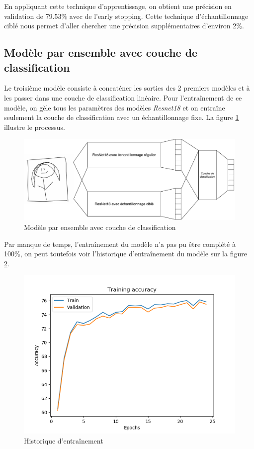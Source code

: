 En appliquant cette technique d'apprentissage, on obtient une précision en validation de 79.53\% avec de l'early stopping. 
Cette technique d'échantillonnage ciblé nous permet d'aller chercher une précision supplémentaires d'environ 2\%.


\subsection{Modèle par ensemble avec couche de classification}
Le troisième modèle consiste à concaténer les sorties des 2 premiers modèles et à les passer dans une couche de classification linéaire. Pour l'entraînement de ce modèle, on gèle tous les paramètres des modèles \emph{Resnet18} et on entraîne seulement la couche de classification avec un échantillonnage fixe. La figure \ref{strutureensemble} illustre le processus.

\begin{figure}[h]
	\includegraphics[width=\linewidth]{images/structure_reseau.pdf} %
	\caption{Modèle par ensemble avec couche de classification} %
	\label{strutureensemble} 
\end{figure}


Par manque de temps, l'entraînement du modèle n'a pas pu être complété à 100\%, on peut toutefois voir l'historique d'entraînement du modèle sur la figure \ref{histmodelensemble}.


\begin{figure}[h]
	\includegraphics[width=\linewidth]{images/Model_ensemble.png} %
	\caption{Historique d'entraînement} %
	\label{histmodelensemble} 
\end{figure}


